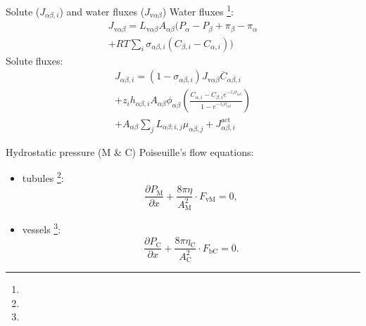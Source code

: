 \documentclass[serif]{beamer}
\begin{document}
\begin{frame}{Solute ($J_{\alpha\beta,i}$) and water fluxes ($J_{\mathrm{v}\alpha\beta}$)}
    Water fluxes \citep{Weinstein1983}\footnote[frame,1]{\tiny{}}:
    \begin{multline}
        J_{\mathrm{v}\alpha\beta} = 
            L_{\mathrm{v}\alpha\beta}A_{\alpha\beta}\bigg(P_\alpha-P_\beta+\pi_\beta-\pi_\alpha\\
            +RT\sum_i\sigma_{\alpha\beta,i}\left(C_{\beta,i}-C_{\alpha,i}\right)\bigg)
    \end{multline}
    Solute fluxes:
    \begin{multline}
        J_{\alpha\beta,i} = (1-\sigma_{\alpha\beta,i})J_{\mathrm{v}\alpha\beta}\overline{C}_{\alpha\beta,i}\\
        +z_ih_{\alpha\beta,i}A_{\alpha\beta}\phi_{\alpha\beta}\left(\frac{C_{\alpha,i}-C_{\beta,i}e^{-z_i\phi_{\alpha\beta}}}{1-e^{-z_i\phi_{\alpha\beta}}}\right)\\
        +A_{\alpha\beta}\sum_j L_{\alpha\beta;i,j}\mu_{\alpha\beta,j} + J^{\mathrm{act}}_{\alpha\beta,i}
    \end{multline}

\end{frame}
        
\begin{frame}{Hydrostatic pressure (M \& C)}
    Poiseuille's flow equations:
    \begin{itemize}
        \item tubules \citep{Weinstein1998}\footnote[frame,1]{\tiny{}}:
        \begin{equation}
            \frac{\partial P_\mathrm{M}}{\partial x}+\frac{8\pi\eta}{A^2_\mathrm{M}}\cdot F_\mathrm{vM}=0,
        \end{equation}
        \item vessels \citep{Weinstein2017}\footnote[frame,2]{\tiny{}}:
        \begin{equation}
            \frac{\partial P_\mathrm{C}}{\partial x}+\frac{8\pi\eta_\mathrm{C}}{A^2_\mathrm{C}}\cdot F_\mathrm{bC}=0.
        \end{equation}
    \end{itemize}
\end{frame}
\end{document}
